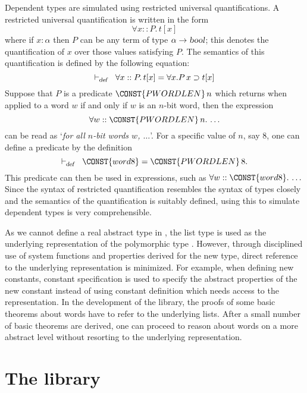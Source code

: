 Dependent types are simulated using restricted universal
quantifications. A restricted universal quantification is written in the form
\[
\forall x ::P.\, t[x]
\]
where if $x:\alpha$ then $P$ can be any term of type $\alpha\rightarrow
\mbox{\sl bool}$; this
denotes the quantification of $x$ over those values satisfying $P$.
The semantics of this quantification is defined by the following
equation:
\begin{equation}
\DEF \forall x ::P.\, t[x] = \forall x. P\,x \IMP t[x]
\end{equation}
Suppose that $P$ is a predicate $\CONST{PWORDLEN}\,n$ which returns
 when applied to a word $w$ if and only if $w$ is an $n$-bit
word, then the expression
\[
\FORALL w \RESDOT \CONST{PWORDLEN}\,n\DOT \ldots
\]
can be read as `{\it for all $n$-bit words $w$, $\ldots$}'. For
a specific value of $n$, say 8, one can define a predicate
 by the definition
\[
\DEF \CONST{word8} = \CONST{PWORDLEN}\,8.
\]
This predicate can then be used in expressions, such as
$\FORALL w \RESDOT \CONST{word8}\DOT \ldots$
Since the syntax of restricted quantification resembles the syntax of
types closely and the semantics of the quantification is suitably
defined,  using this to simulate dependent types is very comprehensible.

As we cannot define a real abstract type in \HOL, the list type is used as the
underlying representation of the polymorphic type \word{*}. However,
through disciplined use of system functions and properties derived for
the new type, direct reference to the underlying
representation is minimized. For example, when defining new constants,
constant specification is used to specify the abstract properties of the
new constant instead of using constant definition which needs access
to the representation. In the development of the library, the proofs
of some basic theorems about words have to refer to the underlying
lists. After a small number of basic theorems are derived, one can
proceed to reason about words on a more abstract level without
resorting to the underlying representation.

\section{The library}


